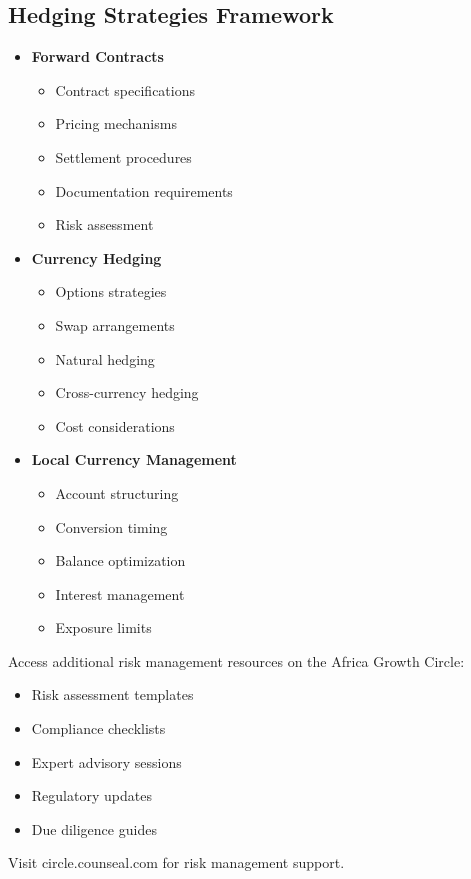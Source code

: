 \subsection{Hedging Strategies Framework}\label{subsec:hedging-strategies-framework}
\begin{tcolorbox}[colback=white,colframe=primarydark,title=\textbf{Currency Risk Mitigation Strategies}]
\begin{itemize}
    \item \textbf{Forward Contracts}
    \begin{itemize}
        \item Contract specifications
        \item Pricing mechanisms
        \item Settlement procedures
        \item Documentation requirements
        \item Risk assessment
    \end{itemize}

    \item \textbf{Currency Hedging}
    \begin{itemize}
        \item Options strategies
        \item Swap arrangements
        \item Natural hedging
        \item Cross-currency hedging
        \item Cost considerations
    \end{itemize}

    \item \textbf{Local Currency Management}
    \begin{itemize}
        \item Account structuring
        \item Conversion timing
        \item Balance optimization
        \item Interest management
        \item Exposure limits
    \end{itemize}
\end{itemize}
\end{tcolorbox}

\begin{communitybox}
Access additional risk management resources on the Africa Growth Circle:
\begin{itemize}
    \item Risk assessment templates
    \item Compliance checklists
    \item Expert advisory sessions
    \item Regulatory updates
    \item Due diligence guides
\end{itemize}
Visit circle.counseal.com for risk management support.
\end{communitybox}

